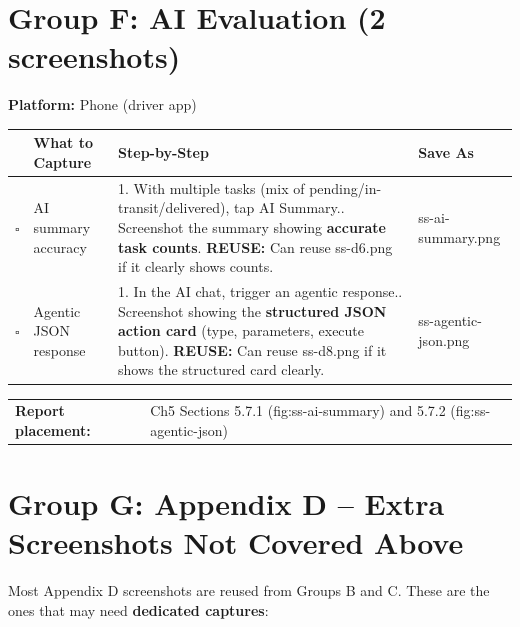 \documentclass[11pt,a4paper]{article}
\newcommand{\checkbox}{$\square$\;}
\newcommand{\reuse}[1]{{\color{reuseorange}\textbf{REUSE:} #1}}
\newcommand{\filesave}[1]{{\ttfamily\small #1}}
\begin{document}
\section{Group F: AI Evaluation (2 screenshots)}

\textbf{Platform:} Phone (driver app)

\begin{longtable}{@{}p{0.4cm} p{2.8cm} p{6.2cm} p{3.5cm}@{}}
  \toprule
  & \textbf{What to Capture} & \textbf{Step-by-Step} & \textbf{Save As} \\
  \midrule
  \checkbox & AI summary accuracy &
    1. With multiple tasks (mix of pending/in-transit/delivered), tap AI Summary.\newline
    2. Screenshot the summary showing \textbf{accurate task counts}.\newline
    \reuse{Can reuse ss-d6.png if it clearly shows counts.} &
    \filesave{ss-ai-summary.png} \\[6pt]

  \checkbox & Agentic JSON response &
    1. In the AI chat, trigger an agentic response.\newline
    2. Screenshot showing the \textbf{structured JSON action card} (type, parameters, execute button).\newline
    \reuse{Can reuse ss-d8.png if it shows the structured card clearly.} &
    \filesave{ss-agentic-json.png} \\
  \bottomrule
\end{longtable}

\medskip
\begin{tabular}{@{}ll@{}}
  \textbf{Report placement:} & Ch5 Sections 5.7.1 (fig:ss-ai-summary) and 5.7.2 (fig:ss-agentic-json) \\
\end{tabular}

\section{Group G: Appendix D -- Extra Screenshots Not Covered Above}

Most Appendix D screenshots are reused from Groups B and C. These are the ones that may need \textbf{dedicated captures}:
\end{document}
